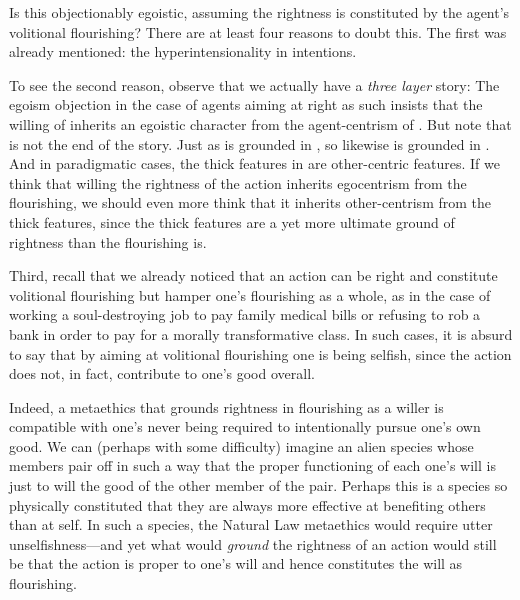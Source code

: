 Is this objectionably egoistic, assuming the rightness is constituted by the agent's volitional
flourishing? There are at least four reasons to doubt this. The first was already mentioned: the hyperintensionality in 
intentions.

To see the second reason, observe that we actually have a \textit{three layer} story:
The egoism objection in the case of agents aiming at right as such insists that the willing of  inherits 
an egoistic character from the agent-centrism of . But note that  is not the end of the story. Just as 
 is grounded in 
, so likewise  is grounded in . And in paradigmatic cases, the thick features in  
are other-centric features. If we think that willing the rightness of the action inherits egocentrism from the flourishing, we should even more 
think that it inherits  other-centrism from the thick features, since the thick features are a yet more ultimate ground of rightness
than the flourishing is.

Third, recall that we already noticed that an action can be right and constitute volitional flourishing but hamper one's flourishing as 
a whole, as in the case of working a soul-destroying job to pay family medical bills or refusing to rob a bank in order to pay for a 
morally transformative class. In such cases, it is absurd to say that by aiming at volitional flourishing one is being selfish, since the
action does not, in fact, contribute to one's good overall.

Indeed, a metaethics that grounds rightness in flourishing as a willer is compatible with one's never being required to intentionally pursue one's own good.
We can (perhaps with some difficulty) imagine an alien species whose members pair off in such a way that the proper functioning of
each one's will is just to will the good of the other member of the pair. Perhaps this is a species so physically constituted that
they are always more effective at benefiting others than at self. In such a species, the Natural Law metaethics would require 
utter unselfishness---and yet what would \textit{ground} the rightness of an action would still be that the action is proper to one's
will and hence constitutes the will as flourishing. 

